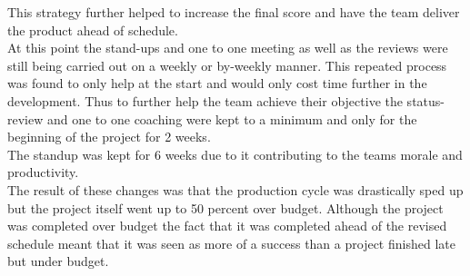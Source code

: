 \documentclass{article}
\begin{document}
This strategy further helped to increase the final score and have the team deliver the product ahead of schedule. \\
At this point the stand-ups and one to one meeting as well as the reviews were still being carried out on a weekly or by-weekly manner. This repeated process was found to only help at the start and would only cost time further in the development. Thus to further help the team achieve their objective the status-review and one to one coaching were kept to a minimum and only for the beginning of the project for 2 weeks.\\
The standup was kept for 6 weeks due to it contributing to the teams morale and productivity.\\
The result of these changes was that the production cycle was drastically sped up but the project itself went up to 50 percent over budget. Although the project was completed over budget the fact that it was completed ahead of the revised schedule meant that it was seen as more of a success than a project finished late but under budget.
\end{document}
